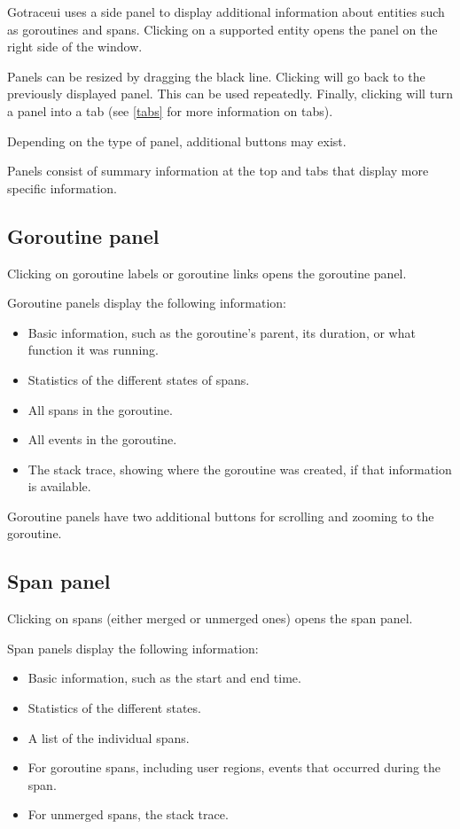 \documentclass[10pt,letterpaper,oneside,openany,english]{memoir}
\begin{document}
Gotraceui uses a side panel to display additional information about entities such as goroutines and spans.
Clicking on a supported entity opens the panel on the right side of the window.

Panels can be resized by dragging the black line.
Clicking  will go back to the previously displayed panel. This can be used repeatedly.
Finally, clicking  will turn a panel into a tab (see \cref{tabs} for more information on tabs).

Depending on the type of panel, additional buttons may exist.

Panels consist of summary information at the top and tabs that display more specific information.

\subsection{Goroutine panel}

Clicking on goroutine labels or goroutine links opens the goroutine panel.

Goroutine panels display the following information:

\begin{itemize}
\item Basic information, such as the goroutine's parent, its duration, or what function it was running.
\item Statistics of the different states of spans.
\item All spans in the goroutine.
\item All events in the goroutine.
\item The stack trace, showing where the goroutine was created, if that information is available.
\end{itemize}

Goroutine panels have two additional buttons for scrolling and zooming to the goroutine.

\subsection{Span panel}\label{span-panel}

Clicking on spans (either merged or unmerged ones) opens the span panel.

Span panels display the following information:

\begin{itemize}
\item Basic information, such as the start and end time.
\item Statistics of the different states.
\item A list of the individual spans.
\item For goroutine spans, including user regions, events that occurred during the span.
\item For unmerged spans, the stack trace.
\end{itemize}
\end{document}

